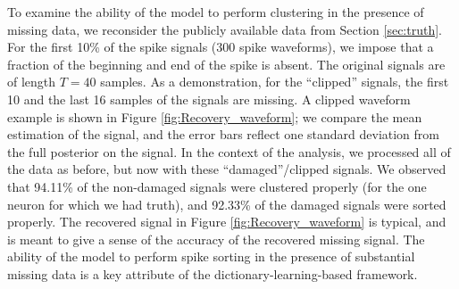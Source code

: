 \documentclass[journal]{IEEEtran}
\begin{document}
To examine the ability of the model to perform clustering in the
presence of missing data, we reconsider the publicly available data
from Section \ref{sec:truth}. For the first 10\% of the spike
signals (300 spike waveforms), we impose that a fraction of
the beginning and end of the spike is absent. The original signals
are of length $T=40$ samples. As a demonstration, for the ``clipped'' signals, the first 10 and the last 16 samples of the
signals are missing. A clipped waveform example is shown in Figure \ref{fig:Recovery_waveform}; we compare the mean estimation of the signal, and the error bars reflect one standard deviation from the full posterior on the signal.
In the context of the analysis, we processed all of the data as before, but now with these ``damaged''/clipped signals. We observed that 94.11\% of the non-damaged signals were clustered properly (for the one neuron for which we had truth), and 92.33\% of the damaged signals were sorted properly. The recovered signal in Figure \ref{fig:Recovery_waveform} is typical, and is meant to give a sense of the accuracy of the recovered missing signal. The ability of the model to perform spike sorting in the presence of substantial missing data is a key attribute of the dictionary-learning-based framework.

\end{document}
